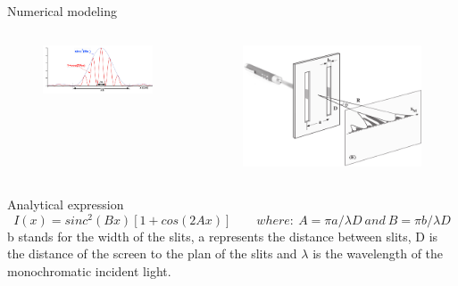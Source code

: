 \documentclass[serif ,mathserif, 8pt]{beamer}
\begin{document}
\begin{frame}{Numerical modeling}
\begin{columns}[c]
	\begin{column}{0.6\textwidth}
		\begin{figure}
			\includegraphics[width=\linewidth]{images/im2}
		\end{figure}
	\end{column}
	
	\begin{column}{0.4\textwidth}
			\begin{figure}
			\includegraphics[width=\linewidth]{images/DoubleFente}
		\end{figure}
	\end{column}
\end{columns}
	
\begin{block}{Analytical expression}
	\begin{equation*}
	I(x) = sinc^2 (Bx)[1+cos(2Ax)] \quad \quad where: \ A = \pi a /\lambda D \ and \ B = \pi b / \lambda D
	\end{equation*}
	b stands for the width of the slits, a represents the distance between slits, D is the distance of the screen to the plan of the slits and $\lambda$ is the wavelength of the monochromatic incident light.
\end{block}


\end{frame}
\end{document}
